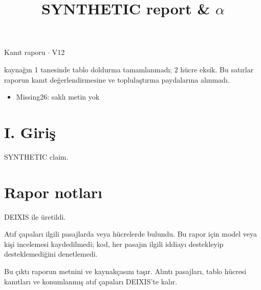 \documentclass[journal]{IEEEtran}
\begin{document}
\renewcommand{\abstractname}{Özet}
\renewcommand{\IEEEkeywordsname}{Dizin Terimleri}
\renewcommand{\refname}{Kaynaklar}

\title{SYNTHETIC report \& \ensuremath{\alpha}}

\maketitle

\noindent Kanıt raporu \ensuremath{\cdot} V12

 kaynağın 1 tanesinde tablo doldurma tamamlanmadı; 2 hücre eksik. Bu satırlar raporun kanıt değerlendirmesine ve toplulaştırma paydalarına alınmadı.

\begin{itemize}
\item Missing26: saklı metin yok
\end{itemize}

\section*{I. Giriş}

SYNTHETIC claim. \cite{Synth26}

\section*{Rapor notları}

DEIXIS ile üretildi.

Atıf çapaları ilgili pasajlarda veya hücrelerde bulundu. Bu rapor için model veya kişi incelemesi kaydedilmedi; kod, her pasajın ilgili iddiayı destekleyip desteklemediğini denetlemedi.

Bu çıktı raporun metnini ve kaynakçasını taşır. Alıntı pasajları, tablo hücresi kanıtları ve konumlanmış atıf çapaları DEIXIS'te kalır.




\end{document}
